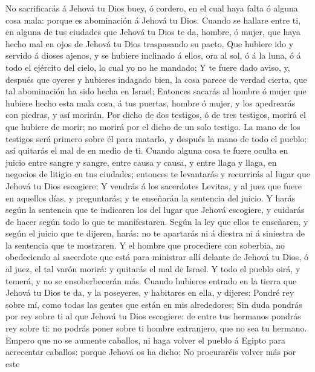  No sacrificarás á Jehová tu Dios buey, ó cordero, en el
cual haya falta ó alguna cosa mala: porque es abominación á Jehová tu
Dios.  Cuando se hallare entre ti, en alguna de tus
ciudades que Jehová tu Dios te da, hombre, ó mujer, que haya hecho mal
en ojos de Jehová tu Dios traspasando su pacto,  Que
hubiere ido y servido á dioses ajenos, y se hubiere inclinado á ellos,
ora al sol, ó á la luna, ó á todo el ejército del cielo, lo cual yo no
he mandado;  Y te fuere dado aviso, y, después que oyeres
y hubieres indagado bien, la cosa parece de verdad cierta, que tal
abominación ha sido hecha en Israel;  Entonces sacarás al
hombre ó mujer que hubiere hecho esta mala cosa, á tus puertas, hombre ó
mujer, y los apedrearás con piedras, y así morirán.  Por
dicho de dos testigos, ó de tres testigos, morirá el que hubiere de
morir; no morirá por el dicho de un solo testigo.  La mano
de los testigos será primero sobre él para matarlo, y después la mano de
todo el pueblo: así quitarás el mal de en medio de ti. 
Cuando alguna cosa te fuere oculta en juicio entre sangre y sangre,
entre causa y causa, y entre llaga y llaga, en negocios de litigio en
tus ciudades; entonces te levantarás y recurrirás al lugar que Jehová tu
Dios escogiere;  Y vendrás á los sacerdotes Levitas, y al
juez que fuere en aquellos días, y preguntarás; y te enseñarán la
sentencia del juicio.  Y harás según la sentencia que te
indicaren los del lugar que Jehová escogiere, y cuidarás de hacer según
todo lo que te manifestaren.  Según la ley que ellos te
enseñaren, y según el juicio que te dijeren, harás: no te apartarás ni á
diestra ni á siniestra de la sentencia que te mostraren. 
Y el hombre que procediere con soberbia, no obedeciendo al sacerdote que
está para ministrar allí delante de Jehová tu Dios, ó al juez, el tal
varón morirá: y quitarás el mal de Israel.  Y todo el
pueblo oirá, y temerá, y no se ensoberbecerán más. 
Cuando hubieres entrado en la tierra que Jehová tu Dios te da, y la
poseyeres, y habitares en ella, y dijeres: Pondré rey sobre mí, como
todas las gentes que están en mis alrededores;  Sin duda
pondrás por rey sobre ti al que Jehová tu Dios escogiere: de entre tus
hermanos pondrás rey sobre ti: no podrás poner sobre ti hombre
extranjero, que no sea tu hermano.  Empero que no se
aumente caballos, ni haga volver el pueblo á Egipto para acrecentar
caballos: porque Jehová os ha dicho: No procuraréis volver más por este
